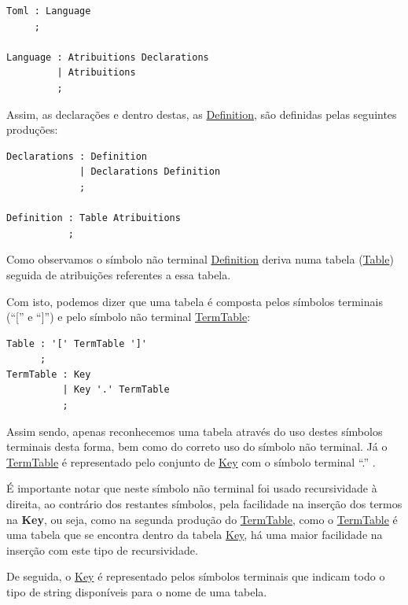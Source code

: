 \documentclass[a4paper,12pt]{report}
\begin{document}
\begin{verbatim}
Toml : Language 
     ;

Language : Atribuitions Declarations    
         | Atribuitions                 
         ;  
\end{verbatim}  

\par Assim, as declarações e dentro destas, as \underline{Definition}, são definidas pelas seguintes produções:

\begin{verbatim}
Declarations : Definition   
             | Declarations Definition 
             ;

Definition : Table Atribuitions               
           ;
\end{verbatim}

\par Como observamos o símbolo não terminal \underline{Definition} deriva numa tabela (\underline{Table}) seguida de atribuições referentes a essa tabela.

\par Com isto, podemos dizer que uma tabela é composta pelos símbolos terminais (``['' e ``]'') e pelo símbolo não terminal \underline{TermTable}:

\begin{verbatim}
Table : '[' TermTable ']'
      ;
TermTable : Key
          | Key '.' TermTable 
          ;
\end{verbatim}

\par Assim sendo, apenas reconhecemos uma tabela através do uso destes símbolos terminais desta forma, bem como do correto uso do símbolo não terminal. Já o \underline{TermTable} é representado pelo conjunto de \underline{Key} com o símbolo terminal ``.'' .

\par É importante notar que neste símbolo não terminal foi usado recursividade à direita, ao contrário dos restantes símbolos, pela facilidade na inserção dos termos na \textbf{Key}, ou seja, como na segunda produção do \underline{TermTable}, como o \underline{TermTable} é uma tabela que se encontra dentro da tabela \underline{Key}, há uma maior facilidade na inserção com este tipo de recursividade.

\vspace{0.5cm}

\par De seguida, o \underline{Key} é representado pelos símbolos terminais que indicam todo o tipo de string disponíveis para o nome de uma tabela.
\end{document}
